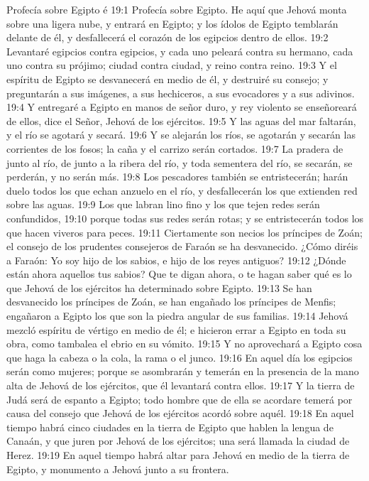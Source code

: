Profecía sobre Egipto  
é
19:1 Profecía sobre Egipto. He aquí que Jehová monta sobre una ligera nube, y entrará en Egipto; y los ídolos de Egipto temblarán delante de él, y desfallecerá el corazón de los egipcios dentro de ellos.  
19:2 Levantaré egipcios contra egipcios, y cada uno peleará contra su hermano, cada uno contra su prójimo; ciudad contra ciudad, y reino contra reino.  
19:3 Y el espíritu de Egipto se desvanecerá en medio de él, y destruiré su consejo; y preguntarán a sus imágenes, a sus hechiceros, a sus evocadores y a sus adivinos.  
19:4 Y entregaré a Egipto en manos de señor duro, y rey violento se enseñoreará de ellos, dice el Señor, Jehová de los ejércitos.  
19:5 Y las aguas del mar faltarán, y el río se agotará y secará.  
19:6 Y se alejarán los ríos, se agotarán y secarán las corrientes de los fosos; la caña y el carrizo serán cortados.  
19:7 La pradera de junto al río, de junto a la ribera del río, y toda sementera del río, se secarán, se perderán, y no serán más.  
19:8 Los pescadores también se entristecerán; harán duelo todos los que echan anzuelo en el río, y desfallecerán los que extienden red sobre las aguas.  
19:9 Los que labran lino fino y los que tejen redes serán confundidos,  
19:10 porque todas sus redes serán rotas; y se entristecerán todos los que hacen viveros para peces.  
19:11 Ciertamente son necios los príncipes de Zoán; el consejo de los prudentes consejeros de Faraón se ha desvanecido. ¿Cómo diréis a Faraón: Yo soy hijo de los sabios, e hijo de los reyes antiguos?  
19:12 ¿Dónde están ahora aquellos tus sabios? Que te digan ahora, o te hagan saber qué es lo que Jehová de los ejércitos ha determinado sobre Egipto.  
19:13 Se han desvanecido los príncipes de Zoán, se han engañado los príncipes de Menfis; engañaron a Egipto los que son la piedra angular de sus familias.  
19:14 Jehová mezcló espíritu de vértigo en medio de él; e hicieron errar a Egipto en toda su obra, como tambalea el ebrio en su vómito.  
19:15 Y no aprovechará a Egipto cosa que haga la cabeza o la cola, la rama o el junco.  
19:16 En aquel día los egipcios serán como mujeres; porque se asombrarán y temerán en la presencia de la mano alta de Jehová de los ejércitos, que él levantará contra ellos.  
19:17 Y la tierra de Judá será de espanto a Egipto; todo hombre que de ella se acordare temerá por causa del consejo que Jehová de los ejércitos acordó sobre aquél.  
19:18 En aquel tiempo habrá cinco ciudades en la tierra de Egipto que hablen la lengua de Canaán, y que juren por Jehová de los ejércitos; una será llamada la ciudad de Herez.  
19:19 En aquel tiempo habrá altar para Jehová en medio de la tierra de Egipto, y monumento a Jehová junto a su frontera.  
